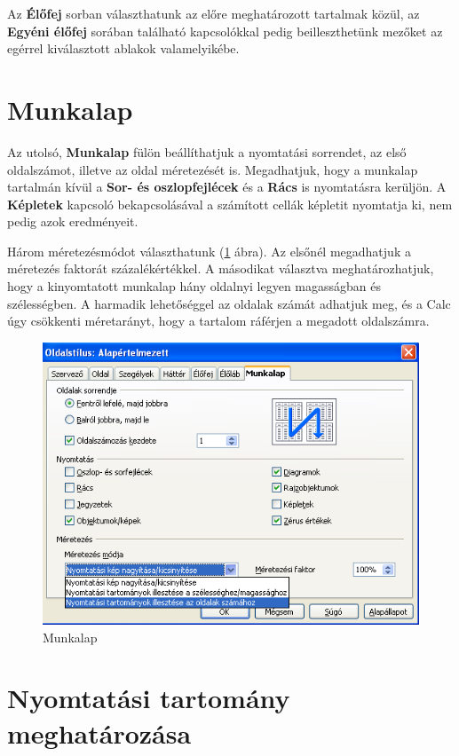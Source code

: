 Az \textbf{Élőfej} sorban választhatunk az előre
meghatározott tartalmak közül, az \textbf{Egyéni élőfej}
sorában található kapcsolókkal pedig beilleszthetünk
mezőket az egérrel kiválasztott ablakok valamelyikébe.


\section{Munkalap}

Az utolsó, \textbf{Munkalap} fülön beállíthatjuk a
nyomtatási sorrendet, az első oldalszámot, illetve az oldal
méretezését is. Megadhatjuk, hogy a munkalap tartalmán
kívül a \textbf{Sor- és oszlopfejlécek} és a \textbf{Rács}
is nyomtatásra kerüljön. A \textbf{Képletek} kapcsoló
bekapcsolásával a számított cellák képletit nyomtatja ki,
nem pedig azok eredményeit.

Három méretezésmódot választhatunk (\ref{Munkalap} ábra). Az
elsőnél megadhatjuk a méretezés faktorát
százalékértékkel. A másodikat választva meghatározhatjuk,
hogy a kinyomtatott munkalap hány oldalnyi legyen magasságban és
szélességben. A harmadik lehetőséggel az oldalak számát
adhatjuk meg, és a Calc úgy csökkenti méretarányt, hogy a
tartalom ráférjen a megadott oldalszámra.

\begin{figure}[!h]
\begin{center}
\includegraphics[width=12.891cm]{oocalcv1-img167.png}
\caption{Munkalap}\label{Munkalap}
\end{center}
\end{figure}


\section{Nyomtatási tartomány meghatározása}

